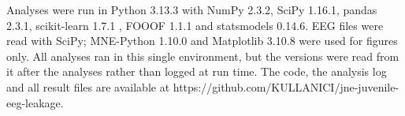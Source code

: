 Analyses were run in Python 3.13.3 with NumPy 2.3.2, SciPy 1.16.1, pandas 2.3.1, scikit-learn 1.7.1 \cite{Pedregosa2011}, FOOOF 1.1.1 \cite{Donoghue2020} and statsmodels 0.14.6. EEG files were read with SciPy; MNE-Python 1.10.0 and Matplotlib 3.10.8 were used for figures only. All analyses ran in this single environment, but the versions were read from it after the analyses rather than logged at run time. The code, the analysis log and all result files are available at https://github.com/KULLANICI/jne-juvenile-eeg-leakage.
